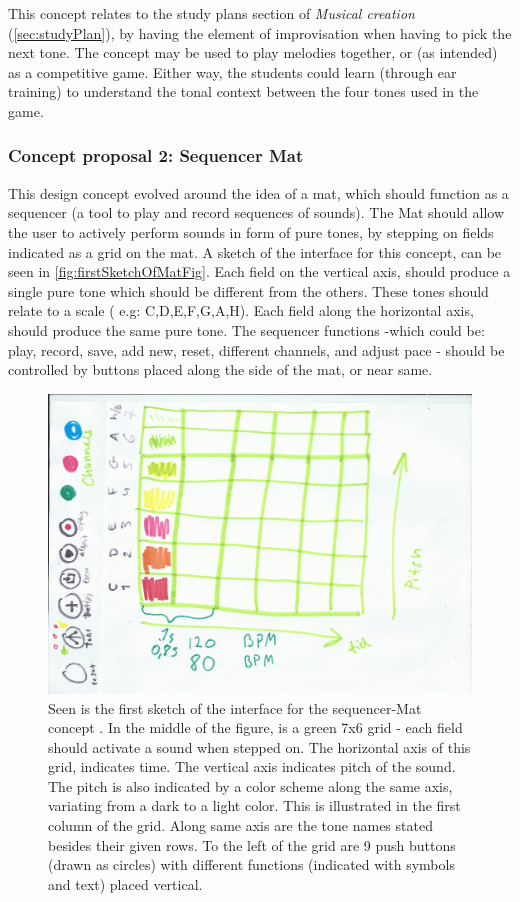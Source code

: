 This concept relates to the study plans section of \textit{Musical creation }(\autoref{sec:studyPlan}), by having the element of improvisation when having to pick the next tone. The concept may be used to play melodies together, or (as intended) as a competitive game. Either way, the students could learn (through ear training) to understand the tonal context between the four tones used in the game.   

\subsubsection{Concept proposal 2: Sequencer Mat}\label{sequencerMat}
This design concept evolved around the idea of a mat, which should function as a sequencer (a tool to play and record sequences of sounds). The Mat should allow the user to actively perform sounds in form of pure tones, by stepping on fields indicated as a grid on the mat. A sketch of the interface for this concept, can be seen in \autoref{fig:firstSketchOfMatFig}. Each field on the vertical axis, should produce a single pure tone which should be different from the others. These tones should relate to a scale ( e.g:  C,D,E,F,G,A,H). Each field along the horizontal axis, should produce the same pure tone. The sequencer functions -which could be: play, record, save, add new, reset, different channels, and adjust pace - should be controlled by buttons placed along the side of the mat, or near same.     

\begin{figure}[H]
	\centering
	\includegraphics[width=0.9\linewidth]{figure/Design/firstSketchOfMat} 
	\caption{Seen is the first sketch of the interface for the sequencer-Mat concept . In the middle of the figure, is a green 7x6 grid - each field should activate a sound when stepped on. The horizontal axis of this grid, indicates time. The vertical axis indicates pitch of the sound. The pitch is also indicated by a color scheme along the same axis, variating from a dark to a light color. This is illustrated in the first column of the grid. Along same axis are the tone names stated besides their given rows. To the left of the grid are 9 push buttons (drawn as circles) with different functions (indicated with symbols and text) placed vertical. }
	\label{fig:firstSketchOfMatFig}
\end{figure}

